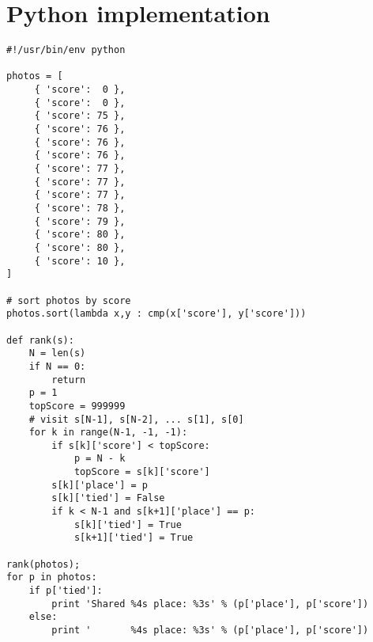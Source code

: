 \documentclass[11pt,a4paper]{article}
\begin{document}
\section{Python implementation}
\begin{verbatim}
#!/usr/bin/env python

photos = [
     { 'score':  0 },
     { 'score':  0 },
     { 'score': 75 },
     { 'score': 76 },
     { 'score': 76 },
     { 'score': 76 },
     { 'score': 77 },
     { 'score': 77 },
     { 'score': 77 },
     { 'score': 78 },
     { 'score': 79 },
     { 'score': 80 },
     { 'score': 80 },
     { 'score': 10 },
]

# sort photos by score
photos.sort(lambda x,y : cmp(x['score'], y['score']))

def rank(s):
    N = len(s)
    if N == 0:
        return
    p = 1
    topScore = 999999
    # visit s[N-1], s[N-2], ... s[1], s[0]
    for k in range(N-1, -1, -1):
        if s[k]['score'] < topScore:
            p = N - k
            topScore = s[k]['score']
        s[k]['place'] = p
        s[k]['tied'] = False
        if k < N-1 and s[k+1]['place'] == p:
            s[k]['tied'] = True
            s[k+1]['tied'] = True
    
rank(photos);
for p in photos:
    if p['tied']:
        print 'Shared %4s place: %3s' % (p['place'], p['score'])
    else:
        print '       %4s place: %3s' % (p['place'], p['score'])
\end{verbatim}
\end{document}

